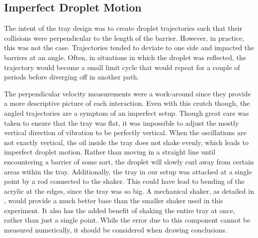     \subsection{Imperfect Droplet Motion}
The intent of the tray design was to create droplet trajectories such that their collisions were perpendicular to the length of the barrier. However, in practice, this was not the case. Trajectories tended to deviate to one side and impacted the barriers at an angle. Often, in situations in which the droplet was reflected, the trajectory would become a small limit cycle that would repeat for a couple of periods before diverging off in another path. 

The perpendicular velocity measurements were a work-around since they provide a more descriptive picture of each interaction. Even with this crutch though, the angled trajectories are a symptom of an imperfect setup. Though great care was taken to ensure that the tray was flat, it was impossible to adjust the mostly vertical direction of vibration to be perfectly vertical. When the oscillations are not exactly vertical, the oil inside the tray does not shake evenly, which leads to imperfect droplet motion. Rather than moving in a straight line until encountering a barrier of some sort, the droplet will slowly curl away from certain areas within the tray. Additionally, the tray in our setup was attached at a single point by a rod connected to the shaker. This could have lead to bending of the acrylic at the edges, since the tray was so big. A mechanical shaker, as detailed in , would provide a much better base than the smaller shaker used in this experiment. It also has the added benefit of shaking the entire tray at once, rather than just a single point. While the error due to this component cannot be measured numerically, it should be considered when drawing conclusions.




